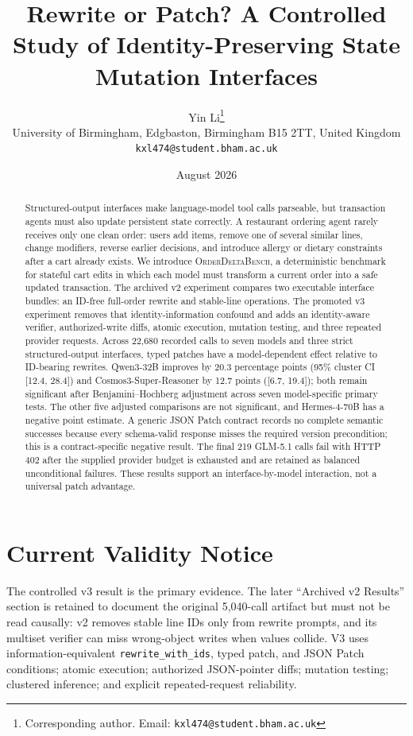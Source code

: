 \documentclass[11pt]{article}
\title{Rewrite or Patch? A Controlled Study of Identity-Preserving State Mutation Interfaces}
\author{Yin Li\thanks{Corresponding author. Email: \texttt{kxl474@student.bham.ac.uk}}\\
University of Birmingham, Edgbaston, Birmingham B15 2TT, United Kingdom\\
\texttt{kxl474@student.bham.ac.uk}}
\date{August 2026}
\newcommand{\orderdelta}{\textsc{OrderDeltaBench}}
\begin{document}
\maketitle

\begin{abstract}
Structured-output interfaces make language-model tool calls parseable, but
transaction agents must also update persistent state correctly.
A restaurant ordering agent rarely receives only one clean order: users add
items, remove one of several similar lines, change modifiers, reverse earlier
decisions, and introduce allergy or dietary constraints after a cart already
exists. We introduce \orderdelta, a deterministic benchmark for stateful cart
edits in which each model must transform a current order into a safe updated
transaction. The archived v2 experiment compares two executable interface
bundles: an ID-free full-order rewrite and stable-line operations. The promoted
v3 experiment removes that identity-information confound and adds an
identity-aware verifier, authorized-write diffs, atomic execution, mutation
testing, and three repeated provider requests. Across 22,680 recorded calls to
seven models and three strict structured-output interfaces, typed patches have
a model-dependent effect relative to ID-bearing rewrites. Qwen3-32B improves by
20.3 percentage points (95\% cluster CI [12.4, 28.4]) and
Cosmos3-Super-Reasoner by 12.7 points ([6.7, 19.4]); both remain significant
after Benjamini--Hochberg adjustment across seven model-specific primary tests.
The other five adjusted comparisons are not significant, and Hermes-4-70B has
a negative point estimate. A generic JSON Patch contract records no complete
semantic successes because every schema-valid response misses the required
version precondition; this is a contract-specific negative result. The final
219 GLM-5.1 calls fail with HTTP 402 after the supplied provider budget is
exhausted and are retained as balanced unconditional failures. These results
support an interface-by-model interaction, not a universal patch advantage.
\end{abstract}

\section*{Current Validity Notice}
The controlled v3 result is the primary evidence. The later ``Archived v2
Results'' section is retained to document the original 5,040-call artifact but
must not be read causally: v2 removes stable line IDs only from rewrite prompts,
and its multiset verifier can miss wrong-object writes when values collide. V3
uses information-equivalent \texttt{rewrite\_with\_ids}, typed patch, and JSON
Patch conditions; atomic execution; authorized JSON-pointer diffs; mutation
testing; clustered inference; and explicit repeated-request reliability.
\end{document}
